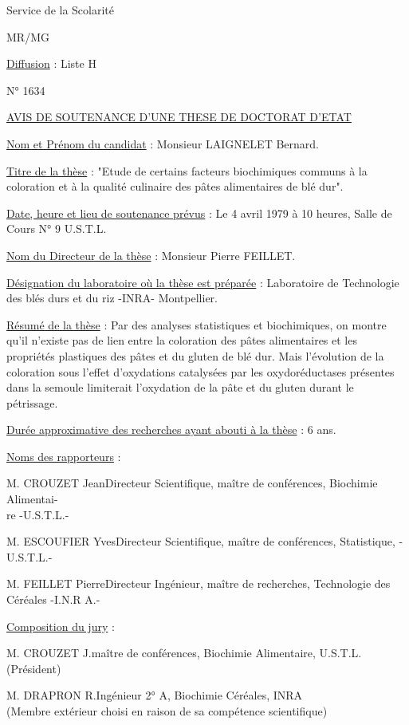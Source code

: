 Service de la Scolarité

MR/MG

\uline{Diffusion} : Liste H

N° 1634

\uline{AVIS DE SOUTENANCE D'UNE THESE DE DOCTORAT D'ETAT}

\uline{Nom et Prénom du candidat} : Monsieur LAIGNELET Bernard.

\uline{Titre de la thèse} : "Etude de certains facteurs biochimiques communs à la coloration et à la qualité culinaire des pâtes alimentaires de blé dur".

\uline{Date, heure et lieu de soutenance prévus} : Le 4 avril 1979 à 10 heures, Salle de Cours N° 9 U.S.T.L.

\uline{Nom du Directeur de la thèse} : Monsieur Pierre FEILLET.

\uline{Désignation du laboratoire où la thèse est préparée} : Laboratoire de Technologie des blés durs et du riz -INRA- Montpellier.

\uline{Résumé de la thèse} : Par des analyses statistiques et biochimiques, on montre qu'il n'existe pas de lien entre la coloration des pâtes alimentaires et les propriétés plastiques des pâtes et du gluten de blé dur.
Mais l'évolution de la coloration sous l'effet d'oxydations catalysées par les oxydoréductases présentes dans la semoule limiterait l'oxydation de la pâte et du gluten durant le pétrissage.

\uline{Durée approximative des recherches ayant abouti à la thèse} : 6 ans.

\uline{Noms des rapporteurs} :

M. CROUZET Jean\quad Directeur Scientifique, maître de conférences, Biochimie Alimentai-\\
\hspace*{3cm}re -U.S.T.L.-

M. ESCOUFIER Yves\quad Directeur Scientifique, maître de conférences, Statistique, -U.S.T.L.-

M. FEILLET Pierre\quad Directeur Ingénieur, maître de recherches, Technologie des Céréales -I.N.R A.-

\uline{Composition du jury} :

M. CROUZET J.\quad maître de conférences, Biochimie Alimentaire, U.S.T.L. (Président)

M. DRAPRON R.\quad Ingénieur 2° A, Biochimie Céréales, INRA\\
\hspace*{3cm}(Membre extérieur choisi en raison de sa compétence scientifique)

